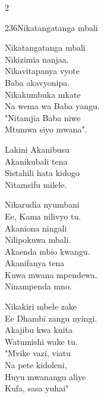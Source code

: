 \documentclass{article}
\begin{document}
\begin{multicols}{2}
\begin{hymn}{236}{Nikatangatanga mbali}{}
\begin{stanza}
Nikatangatanga mbali\\
Nikizimia nanjaa.\\
Nikavitapanya vyote\\
Baba akavyonipa.\\
Nikakumbuka mkate\\
Na wema wa Baba yangu.\\
"Nitamjia Baba niwe\\
Mtumwa siyo mwana".
\end{stanza}
\begin{chorus}
Lakini Akanibusu\\
Akanikubali tena\\
Sistahili hata kidogo\\
Nitamsifu milele.
\end{chorus}
\begin{stanza}
Nikarudia nyumbani\\
Ee, Kama nilivyo tu.\\
Akaniona ningali\\
Nilipokuwa mbali.\\
Akaenda mbio kwangu.\\
Akanifanya tena\\
Kuwa mwana mpendewa.\\
Ninampenda mno.
\end{stanza}
\begin{stanza}
Nikakiri mbele zake\\
Ee Dhambi zangu nyingi.\\
Akajibu kwa kuita\\
Watumishi wake tu.\\
"Mvike vazi, viatu\\
Na pete kidoleni,\\
Huyu mwanangu aliye\\
Kufa, sasa yuhai"
\end{stanza}
\end{hymn}


\end{multicols}
\end{document}
